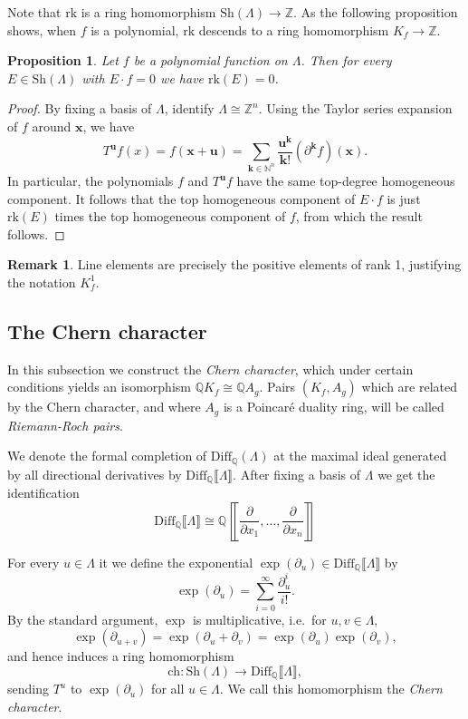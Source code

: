 \documentclass[oneside]{amsart}
\theoremstyle{plain}
\newtheorem{proposition}[theorem]{Proposition}
\theoremstyle{definition}
\newtheorem{remark}[theorem]{Remark}
\newcommand{\Z}{{\mathbb{Z}}}
\newcommand{\N}{{\mathbb{N}}}
\newcommand{\Q}{{\mathbb{Q}}}
\newcommand{\rk}{{\mathrm{rk}}}
\newcommand{\Diff}{{\mathrm{Diff}}}
\newcommand{\Sh}{{\mathrm{Sh}}}
\newcommand{\ch}{{\mathrm{ch}}}
\renewcommand{\vec}[1]{\ensuremath{\mathbf{#1}}}
\begin{document}
Note that $\rk$ is a ring homomorphism 
$\Sh(\Lambda) \to \Z$. As the following proposition shows, when $f$ is a polynomial, $\rk$ descends to a ring homomorphism
$K_f \to \Z$.

\begin{proposition}
    \label{lemma:annihilator-rank-0}
    Let $f$ be a polynomial function on $\Lambda$. Then for every $E\in \Sh(\Lambda)$ with $E\cdot f=0$ we have $\rk(E)=0$. 
\end{proposition}

\begin{proof}
    By fixing a basis of $\Lambda$, identify $\Lambda \cong \Z^n$.
    Using the Taylor series expansion of $f$ around $\vec x$,
    we have
    \[
        T^{\vec u}f(x) = f(\vec x + \vec u) = \sum_{\mathbf{k} \in \N^n} \frac{\mathbf{u}^\mathbf{k}}{\mathbf{k}!} (\partial^{\mathbf{k}}f)(\vec x).
    \]
    In particular, the polynomials $f$ and $T^{\vec u}f$ have the same top-degree homogeneous component. It follows that the top homogeneous component of $E\cdot f$ is just $\rk(E)$ times the top homogeneous component of $f$, from which the result follows.
\end{proof}

\begin{remark}
    Line elements are precisely the positive elements of rank 1, justifying the notation $K_f^1$.
\end{remark}


\subsection{The Chern character}
\label{subsec:chern-character}

In this subsection we construct the \emph{Chern character}, which under certain conditions yields an isomorphism $\Q K_f \cong \Q A_g$. Pairs $(K_f, A_g)$ which are related by the Chern character, and where $A_g$ is a Poincar\'e duality ring, will be called \emph{Riemann-Roch pairs}.

We denote the formal completion of $\Diff_\Q(\Lambda)$ at the maximal ideal generated by all directional derivatives by $\Diff_\Q\llbracket \Lambda \rrbracket$. After fixing a basis of $\Lambda$ we get the identification
\[
\Diff_\Q\llbracket \Lambda \rrbracket \cong 
\Q\left\llbracket\frac{\partial}{\partial x_1},\ldots,\frac{\partial}{\partial x_n}\right\rrbracket
\]

For every $u \in \Lambda$ it we define the exponential $\exp(\partial_u)\in \Diff_\Q\llbracket \Lambda \rrbracket$ by
\[
\exp(\partial_u)= \sum_{i=0}^\infty \frac{\partial_u^i}{i!}.
\]
By the standard argument, $\exp$ is multiplicative, i.e.\ for $u, v \in \Lambda$, 
\[\exp(\partial_{u + v}) = \exp(\partial_u + \partial_v) = \exp(\partial_u)\exp(\partial_v),\]
and hence induces a ring homomorphism
\[
\ch\colon \Sh(\Lambda)\to \Diff_\Q\llbracket \Lambda \rrbracket,
\]
sending $T^u$ to $\exp(\partial_u)$ for all $u\in\Lambda$.
We call this homomorphism the \emph{Chern character}. 
\end{document}

